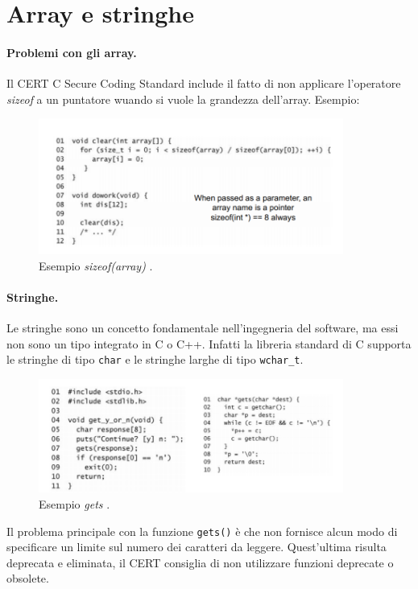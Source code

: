 \section{Array e stringhe}
\paragraph{Problemi con gli array.}Il  CERT C Secure Coding Standard include il fatto di non applicare l'operatore \textit{sizeof} a un puntatore wuando si vuole la grandezza dell'array.
Esempio:
\begin{figure}[H]
    \centering
    \includegraphics[width=10cm, keepaspectratio]{capitoli/secure_coding/img/cap_2/sizeof_array.png}
    \caption{Esempio \textit{sizeof(array)} .}\label{fig:sizeof_array}
\end{figure}
\paragraph{Stringhe.} Le stringhe sono un concetto fondamentale nell'ingegneria del software, ma essi non sono un tipo integrato in C o C++. Infatti la libreria standard di C supporta le stringhe di tipo \verb|char| e le stringhe larghe di tipo \verb|wchar_t|.
\begin{figure}[H]
    \centering
    \includegraphics[width=10cm, keepaspectratio]{capitoli/secure_coding/img/cap_2/gets_1.png}
    \caption{Esempio \textit{gets} .}\label{fig:gets}
\end{figure}
Il problema principale con la funzione \verb|gets()| è che non fornisce alcun modo di specificare un limite sul numero dei caratteri da leggere.
Quest'ultima risulta deprecata e eliminata, il CERT consiglia di non utilizzare funzioni deprecate o obsolete.

